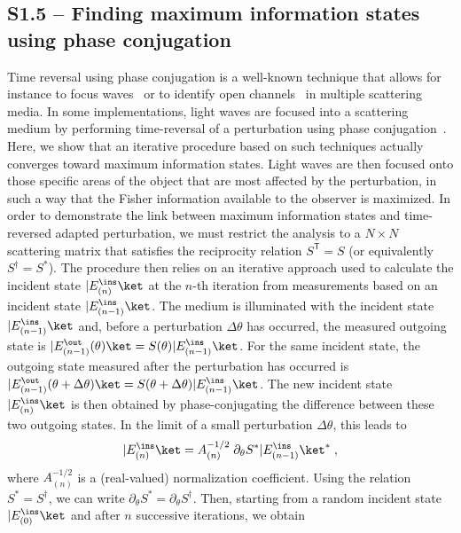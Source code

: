 \documentclass[aps,pra,twocolumn,amsmath,amssymb,superscriptaddress,10pt,nobibnotes]{revtex4-2}
\begin{document}
\subsection*{S1.5 -- Finding maximum information states using phase conjugation}

Time reversal using phase conjugation is a well-known technique that allows for instance to focus waves~\cite{lerosey_focusing_2007_1,xu_time-reversed_2011_1,judkewitz_speckle-scale_2013_1} or to identify open channels~\cite{bosch_frequency_2016_1} in multiple scattering media. In some implementations, light waves are focused into a scattering medium by performing time-reversal of a perturbation using phase conjugation~\cite{zhou_focusing_2014_1,ma_time-reversed_2014_1,ruan_focusing_2017_1}. Here, we show that an iterative procedure based on such techniques actually converges toward maximum information states. Light waves are then focused onto those specific areas of the object that are most affected by the perturbation, in such a way that the Fisher information available to the observer is maximized. In order to demonstrate the link between maximum information states and time-reversed adapted perturbation, we must restrict the analysis to a $N \times N$ scattering matrix that satisfies the reciprocity relation $S^\mathsf{T}=S$ (or equivalently $S^\dagger=S^*$). The procedure then relies on an iterative approach used to calculate the incident state $|E^\ins_{(n)}\ket $ at the $n$-th iteration from measurements based on an incident state $|E^\ins_{(n-1)}\ket $. The medium is illuminated with the incident state $|E^\ins_{(n-1)}\ket $ and, before a perturbation $\Delta \theta$ has occurred, the measured outgoing state is $|E^\out_{(n-1)}(\theta)\ket=S(\theta)| E^\ins_{(n-1)}\ket $. For the same incident state, the outgoing state measured after the perturbation has occurred is $|E^\out_{(n-1)}(\theta+\Delta \theta)\ket=S(\theta+\Delta \theta)| E^\ins_{(n-1)}\ket $. The new incident state $|E^\ins_{(n)}\ket $ is then obtained by phase-conjugating the difference between these two outgoing states. In the limit of a small perturbation $\Delta \theta$, this leads to
\begin{equation}
|E^\ins_{(n)} \ket = A_{(n)}^{-1/2} \;  \partial_\theta S ^* | E^\ins_{(n-1)} \ket ^* \; ,
\label{trap_increment}
\end{equation}
where $A_{(n)}^{-1/2}$ is a (real-valued) normalization coefficient. Using the relation $S^*=S^\dagger$, we can write $\partial_\theta S ^*=\partial_\theta S ^\dagger$. Then, starting from a random incident state $| E^\ins_{(0)} \ket$ and after $n$ successive iterations, we obtain
\end{document}
